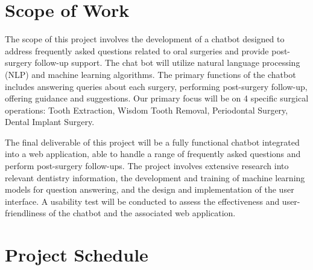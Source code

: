 \documentclass[12pt,oneside,openright,a4paper]{cpe-english-project}
\begin{document}
  \section{Scope of Work}
    \qquad The scope of this project involves the development of a chatbot designed to address frequently asked questions related to oral surgeries and provide post-surgery follow-up support. The chat bot will utilize natural language processing (NLP) and machine learning algorithms. The primary functions of the chatbot includes answering queries about each surgery, performing post-surgery follow-up, offering guidance and suggestions. Our primary focus will be on 4 specific surgical operations: Tooth Extraction, Wisdom Tooth Removal, Periodontal Surgery, Dental Implant Surgery. \par
    \qquad The final deliverable of this project will be a fully functional chatbot integrated into a web application, able to handle a range of frequently asked questions and perform post-surgery follow-ups. The project involves extensive research into relevant dentistry information, the development and training of machine learning models for question answering, and the design and implementation of the user interface. A usability test will be conducted to assess the effectiveness and user-friendliness of the chatbot and the associated web application. \par

  \section{Project Schedule}
\end{document}
